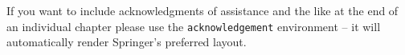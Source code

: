 \documentclass[graybox]{svmult}
\begin{document}

%
\begin{acknowledgement}
If you want to include acknowledgments of assistance and the like at the end of an individual chapter please use the \verb|acknowledgement| environment -- it will automatically render Springer's preferred layout.
\end{acknowledgement}
%


\end{document}
